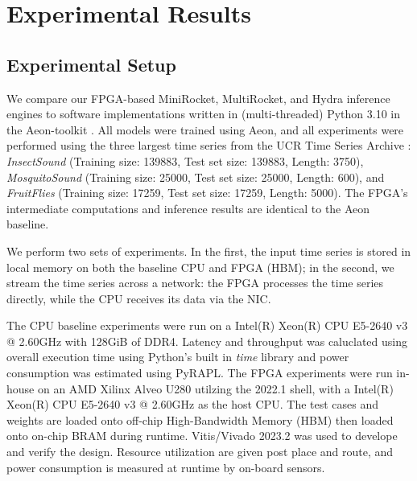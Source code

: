 \section{Experimental Results}
\label{sec:ExpResults}

\subsection{Experimental Setup}
\label{sec:ExpSetup}




We compare our FPGA-based MiniRocket, MultiRocket, and Hydra inference engines to software implementations written in (multi-threaded) Python 3.10 in the Aeon-toolkit \cite{aeon-arxiv, aeon-pkdd}. All models were trained using Aeon, and all experiments were performed using the three largest time series from the UCR Time Series Archive \cite{UCRTimeSeries}: \textit{InsectSound} (Training size: 139883, Test set size: 139883, Length: 3750), \textit{MosquitoSound} (Training size: 25000, Test set size: 25000, Length: 600), and \textit{FruitFlies} (Training size: 17259, Test set size: 17259, Length: 5000). The FPGA's intermediate computations and inference results are identical to the Aeon baseline. 

We perform two sets of experiments. In the first, the input time series is stored in local memory on both the baseline CPU and FPGA (HBM); in the second, we stream the time series across a network: the FPGA processes the time series directly, while the CPU receives its data via the NIC. 

The CPU baseline experiments were run on a Intel(R) Xeon(R) CPU E5-2640 v3 @ 2.60GHz with 128GiB of DDR4. Latency and throughput was caluclated using overall execution time using Python's built in \textit{time} library and power consumption was estimated using PyRAPL. The FPGA experiments were run in-house on an AMD Xilinx Alveo U280 utilzing the 2022.1 shell, with a Intel(R) Xeon(R) CPU E5-2640 v3 @ 2.60GHz as the host CPU. The test cases and weights are loaded onto off-chip High-Bandwidth Memory (HBM) then loaded onto on-chip BRAM during runtime. Vitis/Vivado 2023.2 was used to develope and verify the design. Resource utilization are given post place and route, and power consumption is measured at runtime by on-board sensors. 

